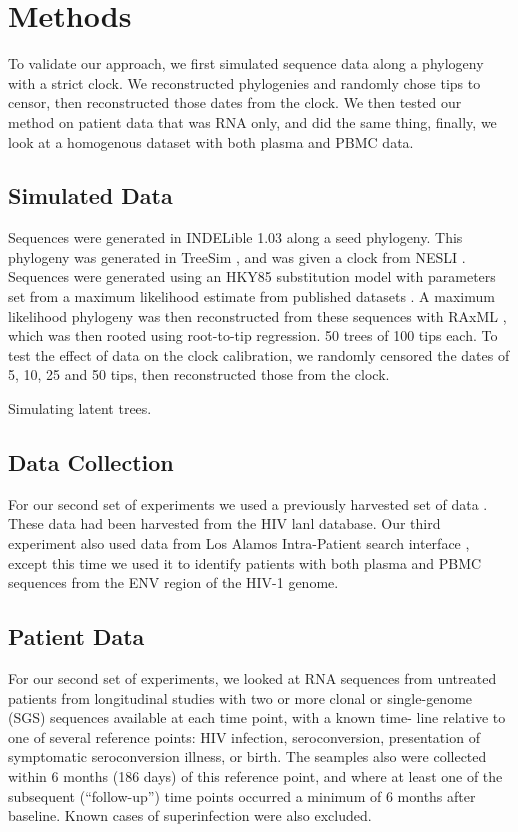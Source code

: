 \section{Methods} \label{sec:methods}
To validate our approach, we first simulated sequence data along a phylogeny with a strict clock. We reconstructed phylogenies and randomly chose tips to censor, then reconstructed those dates from the clock. We then tested our method on patient data that was RNA only, and did the same thing, finally, we look at a homogenous dataset with both plasma and PBMC data. 

\subsection{Simulated Data} \label{subsec:simdata}
Sequences were generated in INDELible 1.03 \citep{Indelible09} along a seed phylogeny. This phylogeny was generated in TreeSim \citep{TreeSim}, and was given a clock from NESLI \citep{NELSI}. Sequences were generated using an HKY85 substitution model with parameters set from a maximum likelihood estimate from published datasets \citep{McCloskey14}. A maximum likelihood phylogeny was then reconstructed from these sequences with RAxML \citep{Raxml14}, which was then rooted using root-to-tip regression. 50 trees of 100 tips each. To test the effect of data on the clock calibration, we randomly censored the dates of 5, 10, 25 and 50 tips, then reconstructed those from the clock.

Simulating latent trees. \citep{Immonen14}


\subsection{Data Collection} \label{subsec:dcollection}
For our second set of experiments we used a previously harvested set of data \citep{McCloskey14}. These data had been harvested from the HIV lanl database. Our third experiment also used data from Los Alamos Intra-Patient search interface \citep{LosAlamos}, except this time we used it to identify patients with both plasma and PBMC sequences from the ENV region of the HIV-1 genome. 

\subsection{Patient Data} \label{subsec:patdata}
 For our second set of experiments, we looked at RNA sequences from untreated patients from longitudinal studies with two or more clonal or single-genome (SGS) sequences available at each time point, with a known time- line relative to one of several reference points: HIV infection, seroconversion, presentation of symptomatic seroconversion illness, or birth. The seamples also were collected within 6 months (186 days) of this reference point, and where at least one of the subsequent (“follow-up”) time points occurred a minimum of 6 months after baseline. Known cases of superinfection were also excluded. 
 
